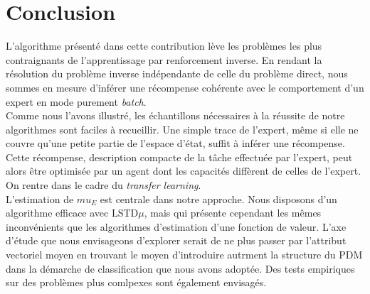 \documentclass[publibook-draft]{CAp2012}
\begin{document}
\section{Conclusion}

L'algorithme présenté dans cette contribution lève les problèmes les plus contraignants de l'apprentissage par renforcement inverse. En rendant la résolution du problème inverse indépendante de celle du problème direct, nous sommes en mesure d'inférer une récompense cohérente avec le comportement d'un expert en mode purement \emph{batch}.\\

Comme nous l'avons illustré, les échantillons nécessaires à la réussite de notre algorithmes sont faciles à recueillir. Une simple trace de l'expert, même si elle ne couvre qu'une petite partie de l'espace d'état, suffit à inférer une récompense. Cette récompense, description compacte de la tâche effectuée par l'expert, peut alors être optimisée par un agent dont les capacités diffèrent de celles de l'expert. On rentre dans le cadre du \emph{transfer learning}.\\

L'estimation de $mu_E$ est centrale dans notre approche. Nous disposons d'un algorithme efficace avec LSTD$\mu$, mais qui présente cependant les mêmes inconvénients que les algorithmes d'estimation d'une fonction de valeur. L'axe d'étude que nous envisageons d'explorer serait de ne plus passer par l'attribut vectoriel moyen en trouvant le moyen d'introduire autrment la structure du PDM dans la démarche de classification que nous avons adoptée. Des tests empiriques sur des problèmes plus comlpexes sont également envisagés.
%
%

\end{document}
